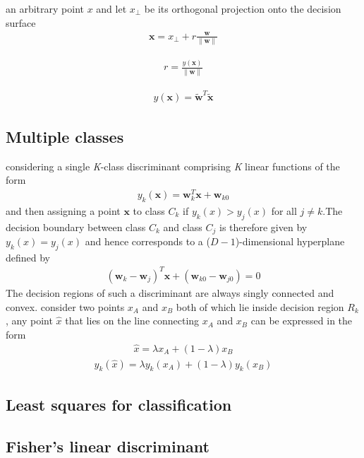 \documentclass[a4paper]{article}
\begin{document}
an arbitrary point $x$ and let $x_{\bot}$ be its orthogonal
 projection onto the decision surface
\begin{align}
\mathbf{x} = x_{\bot} + r \frac{\mathbf{w}}{\|\mathbf{w}\|}
\end{align}

\begin{align}
r = \frac{y(\mathbf{x})}{\|\mathbf{w}\|}
\end{align}

\begin{align}
y(\mathbf{x}) = \widetilde{{\mathbf{w}}}^T \widetilde{{\mathbf{x}}}
\end{align}

\subsection{Multiple classes}
considering a single \textit{K}-class discriminant comprising
 \textit{K} linear functions of the form
\begin{align}
y_k(\mathbf{x}) = \mathbf{w}_k^T \mathbf{x} + \mathbf{w}_{k0}
\end{align}
and then assigning a point $\mathbf{x}$ to class $C_k$ if $y_k(x) >
y_j(x)$ for all $j \neq k$.The decision boundary between class $C_k$ and
 class $C_j$ is therefore given by $y_k(x) = y_j(x)$ and hence
 corresponds to a ($\mathit{D} - 1$)-dimensional hyperplane defined by
\begin{align}
(\mathbf{w}_k - \mathbf{w}_j)^T\mathbf{x} + (\mathbf{w}_{k0} -
  \mathbf{w}_{j0}) = 0
\end{align}
The decision regions of such a discriminant are always singly
 connected and convex. consider two points $x_A$ and $x_B$ both of
 which lie inside decision region $R_k$, any point $\widehat{x}$
 that lies on the line connecting $x_A$ and $x_B$ can be expressed in the form
\begin{align}
\widehat{x} = \lambda x_A + (1 - \lambda)x_B
\end{align}
\begin{align}
y_k(\widehat{x}) = \lambda y_k(x_A) + (1-\lambda)y_k(x_B)
\end{align}

\subsection{Least squares for classification}

\subsection{Fisher’s linear discriminant}
\end{document}
